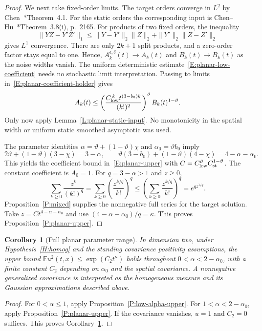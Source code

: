 \documentclass[12pt]{article}
\numberwithin{equation}{section}
\newtheorem{corollary}[theorem]{Corollary}
\theoremstyle{definition}
\newcommand{\E}{\mathbb{E}}
\begin{document}
\begin{proof}
  We next take fixed-order limits. The target orders converge in $L^2$
  by Chen~\cite{chen:author2026:time-dependency}*{Theorem~4.1}.
  For the static orders the corresponding input is
  Chen--Hu~\cite{chen.hu:25:hyperbolic}*{Theorem~3.8(i), p.~2165}.
  For products of two fixed orders, the inequality
  \[
    \|YZ-Y'Z'\|_1
    \le\|Y-Y'\|_2\|Z\|_2+\|Y'\|_2\|Z-Z'\|_2
  \]
  gives $L^1$ convergence. There are only $2k+1$ split products, and
  a zero-order factor stays equal to one. Hence,
  $A_k^{\epsilon,\delta}(t)\to A_k(t)$ and
  $B_k^\epsilon(t)\to B_k(t)$ as the noise widths vanish. The uniform
  deterministic estimate~\eqref{E:planar-low-coefficient} needs no
  stochastic limit interpretation. Passing to limits
  in~\eqref{E:planar-coefficient-holder} gives
  \[
    A_k(t)\le
    \left(\frac{C_{\rm low}^{\,k}t^{(3-b_0)k}}{(k!)^2}\right)^\vartheta
    B_k(t)^{1-\vartheta}.
  \]
  Only now apply Lemma~\ref{L:planar-static-input}. No monotonicity
  in the spatial width or uniform static smoothed asymptotic was used.

  The parameter identities
  $\alpha=\vartheta+(1-\vartheta)\chi$ and
  $\alpha_0=\vartheta b_0$ imply
  \[
    2\vartheta+(1-\vartheta)(3-\chi)=3-\alpha,\qquad
    \vartheta(3-b_0)+(1-\vartheta)(4-\chi)=4-\alpha-\alpha_0.
  \]
  This yields the coefficient bound in~\eqref{E:planar-upper} with
  $C=C_{\rm low}^\vartheta C_{\rm st}^{1-\vartheta}$.
  The constant coefficient is $A_0=1$. For $q=3-\alpha>1$ and $z\ge0$,
  \[
    \sum_{k\ge0}\frac{z^k}{(k!)^q}
    =\sum_{k\ge0}\left(\frac{z^{k/q}}{k!}\right)^q
    \le\left(\sum_{k\ge0}\frac{z^{k/q}}{k!}\right)^q
    =e^{qz^{1/q}}.
  \]
  Proposition~\ref{P:mixed} supplies the nonnegative full series for
  the target solution. Take $z=Ct^{4-\alpha-\alpha_0}$ and use
  $(4-\alpha-\alpha_0)/q=\kappa$. This proves
  Proposition~\ref{P:planar-upper}.
\end{proof}

\begin{corollary}[Full planar parameter range]\label{C:planar-range}
  In dimension two, under Hypothesis~\ref{H:homog} and the standing
  covariance positivity assumptions, the upper bound
  $\E u^2(t,x)\le\exp(C_2t^\kappa)$ holds throughout
  $0<\alpha<2-\alpha_0$, with a finite constant $C_2$ depending on
  $\alpha_0$ and the spatial covariance.
  A nonnegative generalized covariance is interpreted as the homogeneous
  measure and its Gaussian approximations described above.
\end{corollary}

\begin{proof}
  For $0<\alpha\le1$, apply Proposition~\ref{P:low-alpha-upper}.
  For $1<\alpha<2-\alpha_0$, apply Proposition~\ref{P:planar-upper}.
  If the covariance vanishes, $u=1$ and $C_2=0$ suffices. This proves
  Corollary~\ref{C:planar-range}.
\end{proof}
\end{document}
